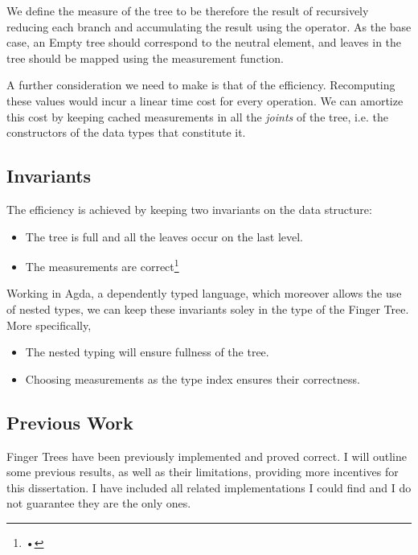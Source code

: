 \documentclass[12pt,twoside,notitlepage]{report}
\begin{document}
We define the measure of the tree to be therefore the result of recursively reducing each branch and accumulating the result using the operator. As the base case, an Empty tree should correspond to the neutral element, and leaves in the tree should be mapped using the measurement function.

A further consideration we need to make is that of the efficiency. Recomputing these values would incur a linear time cost for every operation. We can amortize this cost by keeping cached measurements in all the \textit{joints} of the tree, i.e. the constructors of the data types that constitute it.

\subsection{Invariants}

The efficiency is achieved by keeping two invariants on the data structure:
\begin{itemize}
	\item The tree is full and all the leaves occur on the last level. 
	\item The measurements are correct\footnote{•}
\end{itemize}

Working in Agda, a dependently typed language, which moreover allows the use of nested types, we can keep these invariants soley in the type of the Finger Tree. More specifically,
\begin{itemize}
	\item The nested typing will ensure fullness of the tree.
	\item Choosing measurements as the type index ensures their correctness.  
\end{itemize} 

\subsection{Previous Work}

Finger Trees have been previously implemented and proved correct. I will outline some previous results, as well as their limitations, providing more incentives for this dissertation. I have included all related implementations I could find and I do not guarantee they are the only ones.
\end{document}
